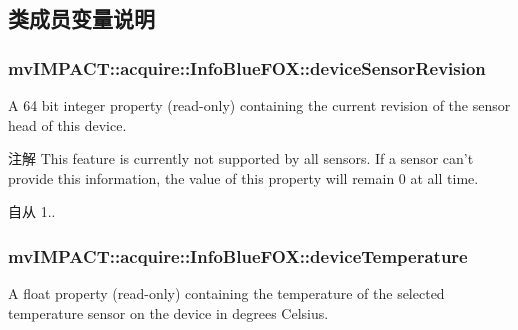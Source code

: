 \subsection{类成员变量说明}
\hypertarget{classmv_i_m_p_a_c_t_1_1acquire_1_1_info_blue_f_o_x_a1d0d0c36611aa0358b055c95ca70a3f9}{
\subsubsection[{device\+Sensor\+Revision}]{ mv\+I\+M\+P\+A\+C\+T\+::acquire\+::\+Info\+Blue\+F\+O\+X\+::device\+Sensor\+Revision}}\label{classmv_i_m_p_a_c_t_1_1acquire_1_1_info_blue_f_o_x_a1d0d0c36611aa0358b055c95ca70a3f9}


A 64 bit integer property {\bfseries }(read-\/only) containing the current revision of the sensor head of this device. 

\begin{DoxyNote}{注解}
This feature is currently not supported by all sensors. If a sensor can't provide this information, the value of this property will remain 0 at all time.
\end{DoxyNote}
\begin{DoxySince}{自从}
1.. 
\end{DoxySince}
\hypertarget{classmv_i_m_p_a_c_t_1_1acquire_1_1_info_blue_f_o_x_abb564f09fadeb6f34ed442ff12c1f4ea}{
\subsubsection[{device\+Temperature}]{ mv\+I\+M\+P\+A\+C\+T\+::acquire\+::\+Info\+Blue\+F\+O\+X\+::device\+Temperature}}\label{classmv_i_m_p_a_c_t_1_1acquire_1_1_info_blue_f_o_x_abb564f09fadeb6f34ed442ff12c1f4ea}


A float property {\bfseries }(read-\/only) containing the temperature of the selected temperature sensor on the device in degrees Celsius. 

